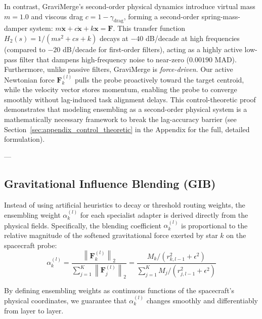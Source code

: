 In contrast, GraviMerge's second-order physical dynamics introduce virtual mass $m = 1.0$ and viscous drag $c = 1 - \gamma_{\text{drag}}$, forming a second-order spring-mass-damper system: $m \ddot{\mathbf{x}} + c \dot{\mathbf{x}} + k \mathbf{x} = \mathbf{F}$. This transfer function $H_2(s) = 1 / (m s^2 + c s + k)$ decays at $-40$ dB/decade at high frequencies (compared to $-20$ dB/decade for first-order filters), acting as a highly active low-pass filter that dampens high-frequency noise to near-zero ($0.00190$ MAD). Furthermore, unlike passive filters, GraviMerge is \textit{force-driven}. Our active Newtonian force $\mathbf{F}_k^{(l)}$ pulls the probe proactively toward the target centroid, while the velocity vector stores momentum, enabling the probe to converge smoothly without lag-induced task alignment delays. This control-theoretic proof demonstrates that modeling ensembling as a second-order physical system is a mathematically necessary framework to break the lag-accuracy barrier (see Section~\ref{sec:appendix_control_theoretic} in the Appendix for the full, detailed formulation).

---

\vspace{-5pt}
\subsection{Gravitational Influence Blending (GIB)}
Instead of using artificial heuristics to decay or threshold routing weights, the ensembling weight $\alpha_k^{(l)}$ for each specialist adapter is derived directly from the physical fields. Specifically, the blending coefficient $\alpha_k^{(l)}$ is proportional to the relative magnitude of the softened gravitational force exerted by star $k$ on the spacecraft probe:
\vspace{-3pt}
\begin{equation}
    \alpha_k^{(l)} = \frac{\left\| \mathbf{F}_k^{(l)} \right\|_2}{\sum_{j=1}^K \left\| \mathbf{F}_j^{(l)} \right\|_2} = \frac{M_k / (r_{k, l-1}^2 + \epsilon^2)}{\sum_{j=1}^K M_j / (r_{j, l-1}^2 + \epsilon^2)}
    \label{eq:gib}
\end{equation}
\vspace{-3pt}

By defining ensembling weights as continuous functions of the spacecraft's physical coordinates, we guarantee that $\alpha_k^{(l)}$ changes smoothly and differentiably from layer to layer. 

